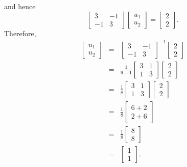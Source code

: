 \begin{solution}
\begin{enumerate}
\[\]
and hence
\[
\left[\begin{array}{cc}  3 & -1 \\ -1 & 3 \end{array}\right]\left[\begin{array}{c} u_1 \\ u_2 \end{array}\right]=\left[\begin{array}{c} 2 \\ 2 \end{array}\right].
\]
Therefore,
\begin{eqnarray*}
\left[\begin{array}{c} u_1 \\ u_2 \end{array}\right]&=&\left[\begin{array}{cc}  3 & -1 \\ -1 & 3 \end{array}\right]^{-1}\left[\begin{array}{c} 2 \\ 2 \end{array}\right]
\\
&=&\frac{1}{9-1}\left[\begin{array}{cc}  3 & 1 \\ 1 & 3 \end{array}\right]\left[\begin{array}{c} 2 \\ 2 \end{array}\right]
\\
&=&\frac{1}{8}\left[\begin{array}{cc}  3 & 1 \\ 1 & 3 \end{array}\right]\left[\begin{array}{c} 2 \\ 2 \end{array}\right]
\\
&=&\frac{1}{8}\left[\begin{array}{c} 6+2 \\ 2+6 \end{array}\right]
\\
&=&\frac{1}{8}\left[\begin{array}{c} 8 \\ 8 \end{array}\right]
\\
&=&\left[\begin{array}{c} 1 \\ 1 \end{array}\right].
\end{eqnarray*}
\end{enumerate} 
\end{solution}